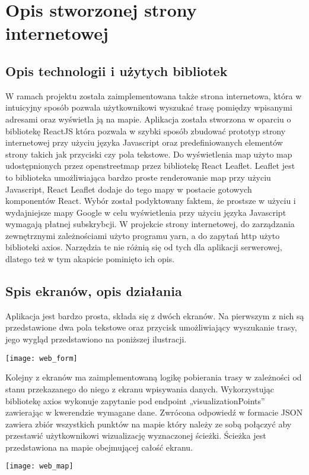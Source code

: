 \section{Opis stworzonej strony internetowej}



\subsection{Opis technologii i użytych bibliotek}

W ramach projektu została zaimplementowana także strona internetowa, która w intuicyjny sposób pozwala użytkownikowi wyszukać trasę pomiędzy wpisanymi adresami oraz wyświetla ją na mapie. 
Aplikacja została stworzona w oparciu o bibliotekę ReactJS która pozwala w szybki sposób zbudować prototyp strony internetowej przy użyciu języka Javascript oraz predefiniowanych elementów strony takich jak przyciski czy pola tekstowe. Do wyświetlenia map użyto map udostępnionych przez openstreetmap przez bibliotekę React Leaflet. Leaflet jest to biblioteka umożliwiająca bardzo proste renderowanie map przy użyciu Javascript, React Leaflet dodaje do tego mapy w postacie gotowych komponentów React. Wybór został podyktowany faktem, że prostsze w użyciu i wydajniejsze mapy Google w celu wyświetlenia przy użyciu języka Javascript wymagają płatnej subskrybcji.
W projekcie strony internetowej, do zarządzania zewnętrznymi zależnościami użyto programu yarn, a do zapytań http użyto biblioteki axios. Narzędzia te nie różnią się od tych dla aplikacji serwerowej, dlatego też w tym akapicie pominięto ich opis.

\subsection{Spis ekranów, opis działania}

Aplikacja jest bardzo prosta, składa się z dwóch ekranów. Na pierwszym z nich są przedstawione dwa pola tekstowe oraz przycisk umożliwiający wyszukanie trasy, jego wygląd przedstawiono na poniższej ilustracji.

\begin{center}
\texttt{[image: web\_form]}
\end{center}

Kolejny z ekranów ma zaimplementowaną logikę pobierania trasy w zależności od stanu przekazanego do niego z ekranu wpisywania danych. Wykorzystując bibliotekę axios wykonuje zapytanie pod endpoint „visualizationPoints” zawierając w kwerendzie wymagane dane. Zwrócona odpowiedź w formacie JSON zawiera zbiór wszystkich punktów na mapie który należy ze sobą połączyć aby przestawić użytkownikowi wizualizację wyznaczonej ścieżki. Ścieżka jest przedstawiona na mapie obejmującej całość ekranu.

\begin{center}
\texttt{[image: web\_map]}
\end{center}
